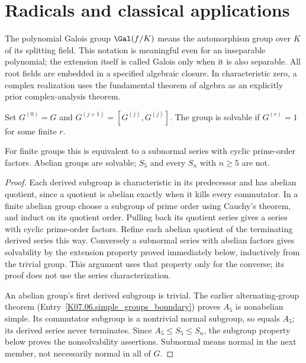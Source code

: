 \chapter{Radicals and classical applications}\label{chap:M07.15}
The polynomial Galois group $\Gal(f/K)$ means the automorphism group over $K$ of its splitting field. This notation is meaningful even for an inseparable polynomial; the extension itself is called Galois only when it is also separable. All root fields are embedded in a specified algebraic closure. In characteristic zero, a complex realization uses the fundamental theorem of algebra as an explicitly prior complex-analysis theorem.

\begin{definition}
Set $G^{(0)}=G$ and $G^{(j+1)}=[G^{(j)},G^{(j)}]$. The group is solvable if $G^{(r)}=1$ for some finite $r$.
\end{definition}
\begin{theorem}
For finite groups this is equivalent to a subnormal series with cyclic prime-order factors. Abelian groups are solvable; $S_5$ and every $S_n$ with $n\geq5$ are not.
\end{theorem}
\begin{proof}
Each derived subgroup is characteristic in its predecessor and has abelian quotient, since a quotient is abelian exactly when it kills every commutator. In a finite abelian group choose a subgroup of prime order using Cauchy's theorem, and induct on its quotient order. Pulling back its quotient series gives a series with cyclic prime-order factors. Refine each abelian quotient of the terminating derived series this way. Conversely a subnormal series with abelian factors gives solvability by the extension property proved immediately below, inductively from the trivial group. This argument uses that property only for the converse; its proof does not use the series characterization.

An abelian group's first derived subgroup is trivial. The earlier alternating-group theorem (Entry~\ref{K07.06.simple_groups_boundary}) proves $A_5$ is nonabelian simple. Its commutator subgroup is a nontrivial normal subgroup, so equals $A_5$; its derived series never terminates. Since $A_5\leq S_5\leq S_n$, the subgroup property below proves the nonsolvability assertions. Subnormal means normal in the next member, not necessarily normal in all of $G$.
\end{proof}

